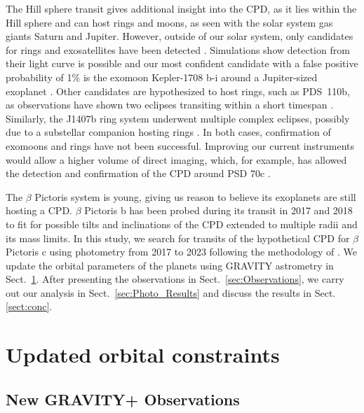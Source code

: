 \documentclass{aa}
\newcommand\picb{$\beta$ Pictoris b}
\newcommand\picc{$\beta$ Pictoris c}
\newcommand\pic{$\beta$ Pictoris}
\begin{document}
	The Hill sphere transit gives additional insight into the CPD, as it lies within the Hill sphere and can host rings and moons, as seen with the solar system gas giants Saturn and Jupiter. 
	However, outside of our solar system, only candidates for rings and exosatellites have been detected \citep{Osborn_2019,Kenworthy_Mamajek_2015,Mamajek_2012,Rieder_2016}. 
	Simulations show detection from their light curve is possible \citep{Alshehhi_2020,Akinsanmi_2017} and our most confident candidate with a false positive probability of 1\% is the exomoon Kepler-1708 b-i around a Jupiter-sized exoplanet \citep{Kipping_2022}. 
	Other candidates are hypothesized to host rings, such as PDS~110b, as observations have shown two eclipses transiting within a short timespan \citep{Osborn_2019}. 
	Similarly, the J1407b ring system underwent multiple complex eclipses, possibly due to a substellar companion hosting rings \citep{Kenworthy_Mamajek_2015,Mamajek_2012,Rieder_2016}. 
	In both cases, confirmation of exomoons and rings have not been successful. 
	Improving our current instruments would allow a higher volume of direct imaging, which, for example, has allowed the detection and confirmation of the CPD around PSD 70c \citep{Benisty_2021}. 
	
	The \pic{} system is young, giving us reason to believe its exoplanets are still hosting a CPD. 
	\picb{} has been probed during its transit in 2017 and 2018 \citep{Kenworthy_2021} to fit for possible tilts and inclinations of the CPD extended to multiple radii and its mass limits. 
	In this study, we search for transits of the hypothetical CPD for \picc{} using photometry from 2017 to 2023 following the methodology of \citet{Kenworthy_2021}.
	We update the orbital parameters of the planets using GRAVITY astrometry in Sect.~\ref{sec:new_grav}.
	After presenting the observations in Sect.~\ref{sec:Observations}, we carry out our analysis in Sect.~\ref{sec:Photo_Results} and discuss the results in Sect.\ref{sect:conc}.
	
	
	\section{Updated orbital constraints}\label{sec:new_grav}
	
	\subsection{New GRAVITY+ Observations}
	
\end{document}
